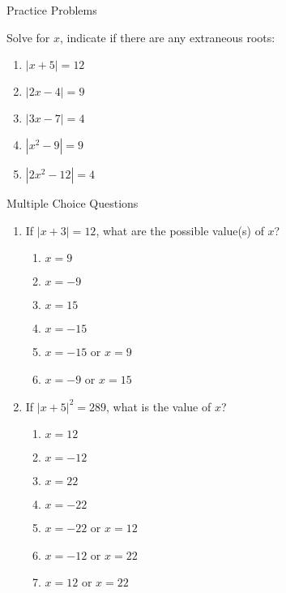 \documentclass[aspectratio=169]{beamer}
\begin{document}
\begin{frame}{Practice Problems}
    \begin{tcolorbox}[colback=lightgray,colframe=primary,title=Solve for $x$]
        \footnotesize
        Solve for $x$, indicate if there are any extraneous roots:
        \begin{enumerate}
            \item $|x+5| = 12$
            \item $|2x-4| = 9$
            \item $|3x-7| = 4$
            \item $|x^2-9| = 9$
            \item $|2x^2-12| = 4$
        \end{enumerate}
    \end{tcolorbox}
\end{frame}

\begin{frame}{Multiple Choice Questions}
    \begin{tcolorbox}[colback=lightgray,colframe=primary,title=Practice Questions]
        \footnotesize
        \begin{enumerate}
            \item If $|x+3| = 12$, what are the possible value(s) of $x$?
            \begin{enumerate}[]
                \item $x = 9$
                \item $x = -9$
                \item $x = 15$
                \item $x = -15$
                \item $x = -15$ or $x = 9$
                \item $x = -9$ or $x = 15$
            \end{enumerate}
            
            \item If $|x+5|^2 = 289$, what is the value of $x$?
            \begin{enumerate}[]
                \item $x = 12$
                \item $x = -12$
                \item $x = 22$
                \item $x = -22$
                \item $x = -22$ or $x = 12$
                \item $x = -12$ or $x = 22$
                \item $x = 12$ or $x = 22$
            \end{enumerate}
        \end{enumerate}
    \end{tcolorbox}
\end{frame}
\end{document}
